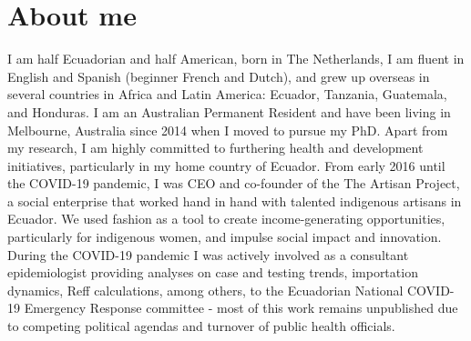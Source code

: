 \documentclass[11pt,a4paper,]{awesome-cv}
\begin{document}
\begin{cvhonors}
\end{cvhonors}

\hypertarget{about-me}{%
\section{About me}\label{about-me}}

I am half Ecuadorian and half American, born in The Netherlands, I am
fluent in English and Spanish (beginner French and Dutch), and grew up
overseas in several countries in Africa and Latin America: Ecuador,
Tanzania, Guatemala, and Honduras. I am an Australian Permanent Resident
and have been living in Melbourne, Australia since 2014 when I moved to
pursue my PhD. Apart from my research, I am highly committed to
furthering health and development initiatives, particularly in my home
country of Ecuador. From early 2016 until the COVID-19 pandemic, I was
CEO and co-founder of the The Artisan Project, a social enterprise that
worked hand in hand with talented indigenous artisans in Ecuador. We
used fashion as a tool to create income-generating opportunities,
particularly for indigenous women, and impulse social impact and
innovation. During the COVID-19 pandemic I was actively involved as a
consultant epidemiologist providing analyses on case and testing trends,
importation dynamics, Reff calculations, among others, to the Ecuadorian
National COVID-19 Emergency Response committee - most of this work
remains unpublished due to competing political agendas and turnover of
public health officials.


\label{LastPage}~
\end{document}
